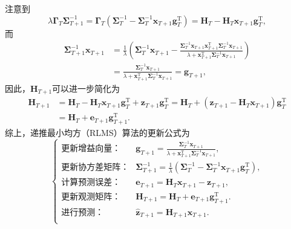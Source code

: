 注意到
\[
    \lambda \mathbf{\Gamma}_T \mathbf{\Sigma}_{T+1}^{-1} = \mathbf{\Gamma}_T \left(  \mathbf{\Sigma}_T^{-1} -  \mathbf{\Sigma}_{T}^{-1} \bm{x}_{T+1} \bm{g}_T^{\mathrm{T}} \right) = \mathbf{H}_T - \mathbf{H}_T \bm{x}_{T+1} \bm{g}_T^{\mathrm{T}},
\]
而
\[
    \begin{split}
        \mathbf{\Sigma}_{T + 1}^{-1} \bm{x}_{T+1} & = \frac{1}{\lambda} \left(  \mathbf{\Sigma}_T^{-1} \bm{x}_{T+1} - \frac{\mathbf{\Sigma}_{T}^{-1} \bm{x}_{T+1} \bm{x}_{T+1}^\mathrm{T} \mathbf{\Sigma}_{T}^{-1} \bm{x}_{T+1} }{\lambda + \bm{x}_{T+1}^\mathrm{T} \mathbf{\Sigma}_{T}^{-1} \bm{x}_{T+1}} \right) \\
                                                  & = \frac{ \mathbf{\Sigma}_T^{-1} \bm{x}_{T+1}}{\lambda + \bm{x}_{T+1}^\mathrm{T} \mathbf{\Sigma}_{T}^{-1} \bm{x}_{T+1}} = \bm{g}_{T+1},
    \end{split}
\]
因此，\( \mathbf{H}_{T+1} \)可以进一步简化为
\[
    \begin{split}
        \mathbf{H}_{T+1} & = \mathbf{H}_T - \mathbf{H}_T \bm{x}_{T+1} \bm{g}_T^{\mathrm{T}}  + \bm{z}_{T+1} \bm{g}_T^{\mathrm{T}} = \mathbf{H}_T + (\bm{z}_{T+1} - \mathbf{H}_T \bm{x}_{T+1}) \bm{g}_T^{\mathrm{T}} \\
                         & = \mathbf{H}_T + \bm{e}_{T+1} \bm{g}_{T+1}^{\mathrm{T}}.
    \end{split}
\]
综上，递推最小均方（RLMS）算法的更新公式为
\[
    \begin{cases}
        \text{更新增益向量：}  & \bm{g}_{T+1} = \frac{\mathbf{\Sigma}_T^{-1} \bm{x}_{T+1}}{\lambda + \bm{x}_{T+1}^\mathrm{T} \mathbf{\Sigma}_T^{-1} \bm{x}_{T+1}},                   \\
        \text{更新协方差矩阵：} & \mathbf{\Sigma}_{T+1}^{-1} = \frac{1}{\lambda} \left( \mathbf{\Sigma}_T^{-1} - \mathbf{\Sigma}_{T}^{-1} \bm{x}_{T+1} \bm{g}_T^{\mathrm{T}} \right), \\
        \text{计算预测误差：}  & \bm{e}_{T+1} = \mathbf{H}_{T}\bm{x}_{T+1} - \bm{z}_{T+1},                                                                                           \\
        \text{更新观测矩阵：}  & \mathbf{H}_{T+1} = \mathbf{H}_T + \bm{e}_{T+1} \bm{g}_{T+1}^{\mathrm{T}}.                                                                           \\
        \text{进行预测：}    & \hat{\bm{z}}_{T+1} = \mathbf{H}_{T+1} \bm{x}_{T+1}.                                                                                                 \\
    \end{cases}
\]

